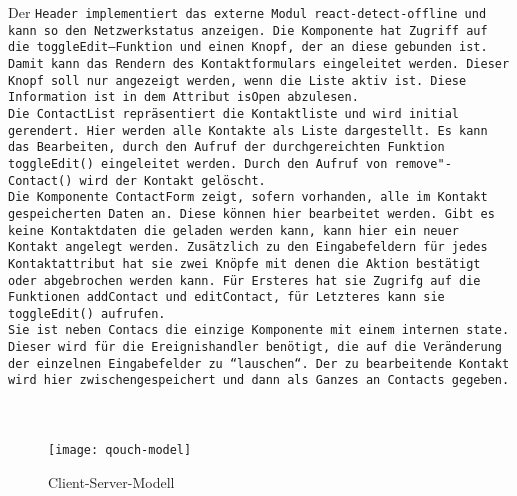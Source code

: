 %
Der \tt{Header} implementiert das externe Modul \tt{react-detect-offline} und kann so den Netzwerkstatus anzeigen. Die Komponente hat Zugriff auf die \tt{toggleEdit}--Funktion und einen Knopf, der an diese gebunden ist. Damit kann das Rendern des Kontaktformulars eingeleitet werden.
Dieser Knopf soll nur angezeigt werden, wenn die Liste aktiv ist. Diese Information ist in dem  Attribut \tt{isOpen} abzulesen.\\
Die \tt{ContactList} repräsentiert die Kontaktliste und wird initial gerendert. Hier werden alle Kontakte als Liste dargestellt.
Es kann das Bearbeiten, durch den Aufruf der durchgereichten Funktion \tt{toggleEdit()} eingeleitet werden. Durch den Aufruf von \tt{remove"-Contact()} wird der Kontakt gelöscht.\\
%
Die Komponente \tt{ContactForm} zeigt, sofern vorhanden, alle im Kontakt gespeicherten Daten an.
Diese können hier bearbeitet werden.
Gibt es keine Kontaktdaten die geladen werden kann, kann hier ein neuer Kontakt angelegt werden.
Zusätzlich zu den Eingabefeldern für jedes Kontaktattribut hat sie zwei Knöpfe mit denen die Aktion bestätigt oder abgebrochen werden kann. Für Ersteres hat sie Zugrifg auf die Funktionen \tt{addContact} und \tt{editContact}, für Letzteres kann sie \tt{toggleEdit()} aufrufen.\\
Sie ist neben \tt{Contacs} die einzige Komponente mit einem internen \tt{state}. Dieser wird für die Ereignishandler benötigt, die auf die Veränderung der einzelnen Eingabefelder zu ``lauschen``. Der zu bearbeitende Kontakt wird hier zwischengespeichert und dann als Ganzes an \tt{Contacts} gegeben.\\
\\\\
%
% 
%
\begin{figure}[H]
  \centering
  \texttt{[image: qouch-model]}
  \grayRule
  \caption{Client-Server-Modell}
  \label{fig:qouch-model}
\end{figure}
%
%

%
%

%
%

%
%
